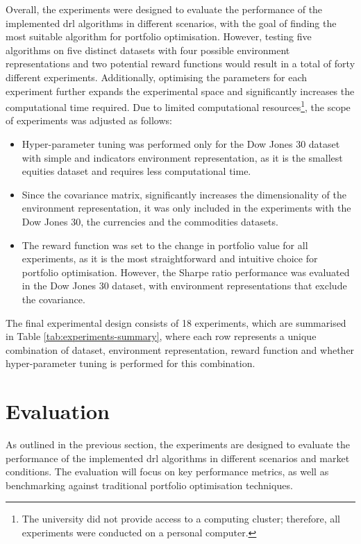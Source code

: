 Overall, the experiments were designed to evaluate the performance of the implemented \acrshort{drl} algorithms in different scenarios, with the goal of finding the most suitable algorithm for portfolio optimisation. However, testing five algorithms on five distinct datasets with four possible environment representations and two potential reward functions would result in a total of forty different experiments. Additionally, optimising the parameters for each experiment further expands the experimental space and significantly increases the computational time required. Due to limited computational resources\footnote{The university did not provide access to a computing cluster; therefore, all experiments were conducted on a personal computer.}, the scope of experiments was adjusted as follows:
\begin{itemize}
    \item Hyper-parameter tuning was performed only for the Dow Jones 30 dataset with simple and indicators environment representation, as it is the smallest equities dataset and requires less computational time.
    \item Since the covariance matrix, significantly increases the dimensionality of the environment representation, it was only included in the experiments with the Dow Jones 30, the currencies and the commodities datasets.
    \item The reward function was set to the change in portfolio value for all experiments, as it is the most straightforward and intuitive choice for portfolio optimisation. However, the Sharpe ratio performance was evaluated in the Dow Jones 30 dataset, with environment representations that exclude the covariance.
\end{itemize}

The final experimental design consists of 18 experiments, which are summarised in Table \ref{tab:experiments-summary}, where each row represents a unique combination of dataset, environment representation, reward function and whether hyper-parameter tuning is performed for this combination.



\section{Evaluation} \label{sec:evaluation}

As outlined in the previous section, the experiments are designed to evaluate the performance of the implemented \acrshort{drl} algorithms in different scenarios and market conditions. The evaluation will focus on key performance metrics, as well as benchmarking against traditional portfolio optimisation techniques.

